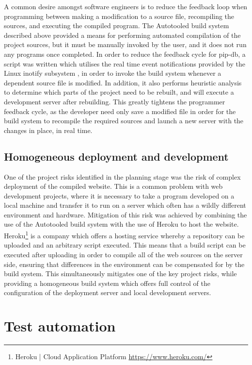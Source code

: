 A common desire amongst software engineers is to reduce the feedback
loop when programming between making a modification to a source file,
recompiling the sources, and executing the compiled program. The
Autotooled build system described above provided a means for
performing automated compilation of the project sources, but it must
be manually invoked by the user, and it does not run any programs once
completed. In order to reduce the feedback cycle for pip-db, a script
was written which utilises the real time event notifications provided
by the Linux inotify subsystem \cite{love2005kernel,
  shields2010inotify}, in order to invoke the build system whenever a
dependent source file is modified. In addition, it also performs
heuristic analysis to determine which parts of the project need to be
rebuilt, and will execute a development server after rebuilding. This
greatly tightens the programmer feedback cycle, as the developer need
only save a modified file in order for the build system to recompile
the required sources and launch a new server with the changes in
place, in real time.

\subsection{Homogeneous deployment and development}\label{subsec:deployment}

One of the project risks identified in the planning stage was the risk
of complex deployment of the compiled website. This is a common
problem with web development projects, where it is necessary to take a
program developed on a local machine and transfer it to run on a
server which often has a wildly different environment and
hardware. Mitigation of this risk was achieved by combining the use of
the Autotooled build system with the use of Heroku to host the
website. Heroku\footnote{Heroku | Cloud Application Platform
  \url{https://www.heroku.com/}} is a company which offers a hosting
service whereby a repository can be uploaded and an arbitrary script
executed. This means that a build script can be executed after
uploading in order to compile all of the web sources on the server
side, ensuring that differences in the environment can be compensated
for by the build system. This simultaneously mitigates one of the key
project risks, while providing a homogeneous build system which offers
full control of the configuration of the deployment server and local
development servers.

\section{Test automation}\label{sec:test-automation}

